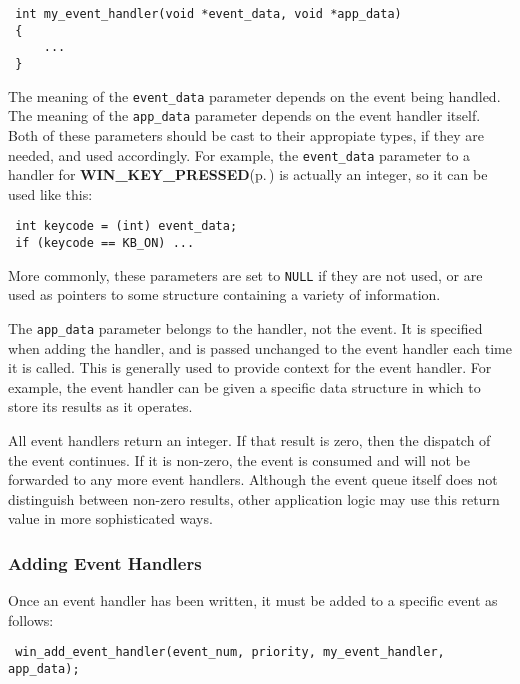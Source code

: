 \footnotesize\begin{verbatim} int my_event_handler(void *event_data, void *app_data)
 {
     ...
 }
\end{verbatim}
\normalsize


The meaning of the {\tt event\_\-data} parameter depends on the event being handled. The meaning of the {\tt app\_\-data} parameter depends on the event handler itself. Both of these parameters should be cast to their appropiate types, if they are needed, and used accordingly. For example, the {\tt event\_\-data} parameter to a handler for {\bf WIN\_\-KEY\_\-PRESSED}{\rm (p.\,\pageref{winkeys_8h_a0})} is actually an integer, so it can be used like this:



\footnotesize\begin{verbatim} int keycode = (int) event_data;
 if (keycode == KB_ON) ...
\end{verbatim}
\normalsize


More commonly, these parameters are set to {\tt NULL} if they are not used, or are used as pointers to some structure containing a variety of information.

The {\tt app\_\-data} parameter belongs to the handler, not the event. It is specified when adding the handler, and is passed unchanged to the event handler each time it is called. This is generally used to provide context for the event handler. For example, the event handler can be given a specific data structure in which to store its results as it operates.

All event handlers return an integer. If that result is zero, then the dispatch of the event continues. If it is non-zero, the event is  consumed and will not be forwarded to any more event handlers. Although the event queue itself does not distinguish between non-zero results, other application logic may use this return value in more sophisticated ways.\subsubsection{Adding Event Handlers}\label{winevent_8h_addhandler}
Once an event handler has been written, it must be added to a specific event as follows:



\footnotesize\begin{verbatim} win_add_event_handler(event_num, priority, my_event_handler, app_data);
\end{verbatim}
\normalsize


